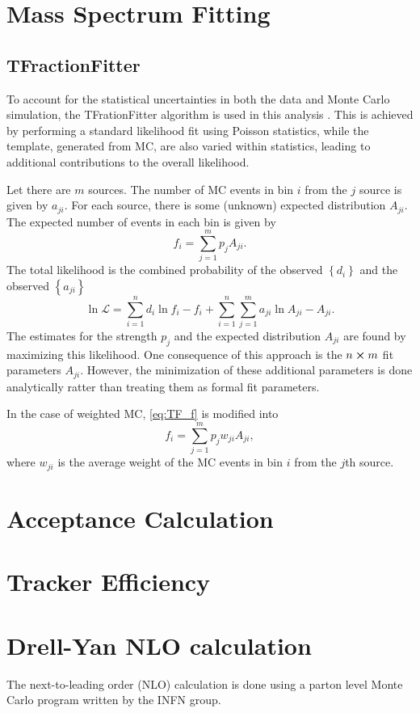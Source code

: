 \documentclass[../main.tex]{subfiles}
\begin{document}
\section{Mass Spectrum Fitting}

\subsection{TFractionFitter}
To account for the statistical uncertainties in both the data and Monte Carlo
simulation, the TFrationFitter algorithm is used in this analysis \cite{barlow1993}.
This is achieved by performing a standard likelihood fit using Poisson statistics,
while the template, generated from MC, are also varied within statistics, leading 
to additional contributions to the overall likelihood.

Let there are $m$ sources. The number of MC events in bin $i$ from the $j$ source
is given by $a_{ji}$. For each source, there is some (unknown) expected distribution
$A_{ji}$. The expected number of events in each bin is given by 
\begin{equation}
	f_i = \sum^m_{j=1} p_j A_{ji}.
	\label{eq:TF_f}
\end{equation}
The total likelihood is the combined probability of the observed $\left\{d_i\right\}$
and the observed $\left\{a_{ji}\right\}$
\begin{equation}
	\ln \mathcal{L} = \sum^n_{i=1} d_i \ln f_i -f_i + \sum^n_{i=1} \sum^m_{j=1} a_{ji} \ln A_{ji} - A_{ji}.
	\label{eq:TF_likelihood}
\end{equation}
The estimates for the strength $p_j$ and the expected distribution $A_{ji}$ are 
found by maximizing this likelihood. One consequence of this approach is the
$n \cross m$ fit parameters $A_{ji}$. However, the  minimization of these additional
parameters is done analytically ratter than treating them as formal fit parameters.

In the case of weighted MC, \cref{eq:TF_f} is modified into
\begin{equation}
	f_i = \sum^m_{j=1} p_j w_{ji}A_{ji},
\end{equation}
where $w_{ji}$ is the average weight of the MC events in bin $i$ from the $j$th source.

\section{Acceptance Calculation}

\section{Tracker Efficiency}

\section{Drell-Yan NLO calculation}
The next-to-leading order (NLO) calculation is done using a parton level Monte
Carlo program written by the INFN group\cite{catani2009,catani2007}.

\ifSubfilesClassLoaded{ \printbibliography[heading=bibintoc,title={References}]}{}
\end{document}
